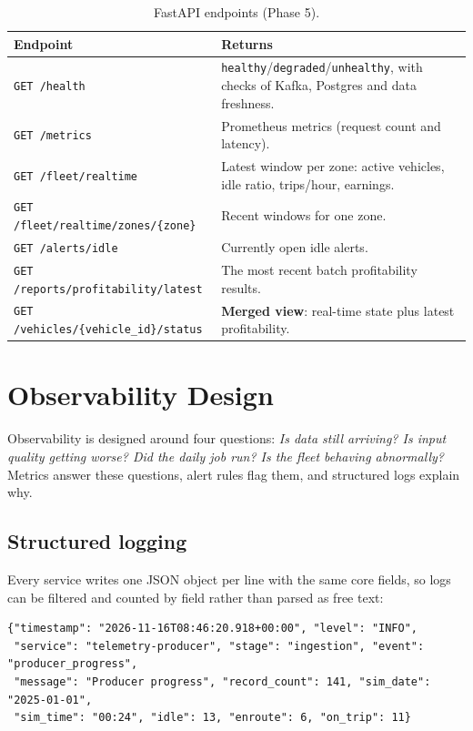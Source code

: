 \documentclass[11pt,a4paper]{article}
\newcommand{\code}[1]{\texttt{\small #1}}
\begin{document}
\begin{table}[H]
\centering\small
\begin{tabularx}{\linewidth}{l Y}
\toprule
\textbf{Endpoint} & \textbf{Returns} \\
\midrule
\code{GET /health} & \code{healthy}/\code{degraded}/\code{unhealthy}, with checks of Kafka,
Postgres and data freshness. \\
\code{GET /metrics} & Prometheus metrics (request count and latency). \\
\code{GET /fleet/realtime} & Latest window per zone: active vehicles, idle ratio, trips/hour,
earnings. \\
\code{GET /fleet/realtime/zones/\{zone\}} & Recent windows for one zone. \\
\code{GET /alerts/idle} & Currently open idle alerts. \\
\code{GET /reports/profitability/latest} & The most recent batch profitability results. \\
\code{GET /vehicles/\{vehicle\_id\}/status} & \textbf{Merged view}: real-time state plus latest
profitability. \\
\bottomrule
\end{tabularx}
\caption{FastAPI endpoints (Phase 5).}
\label{tab:api}
\end{table}

\section{Observability Design}

Observability is designed around four questions: \emph{Is data still arriving? Is input quality
getting worse? Did the daily job run? Is the fleet behaving abnormally?} Metrics answer these
questions, alert rules flag them, and structured logs explain why.

\subsection{Structured logging}

Every service writes one JSON object per line with the same core fields, so logs can be filtered
and counted by field rather than parsed as free text:

\begin{lstlisting}
{"timestamp": "2026-11-16T08:46:20.918+00:00", "level": "INFO",
 "service": "telemetry-producer", "stage": "ingestion", "event": "producer_progress",
 "message": "Producer progress", "record_count": 141, "sim_date": "2025-01-01",
 "sim_time": "00:24", "idle": 13, "enroute": 6, "on_trip": 11}
\end{lstlisting}
\end{document}
